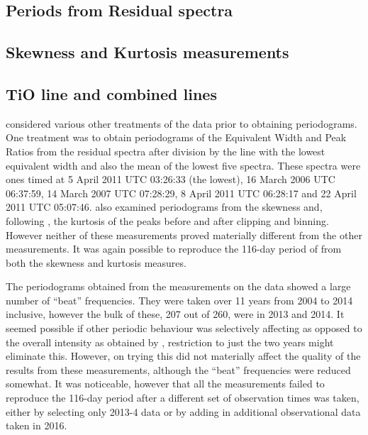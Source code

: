 \subsection{Periods from Residual spectra}
\protect\label{section:residualper}

\subsection{Skewness and Kurtosis measurements}
\protect\label{section:skewkurtper}

\subsection{TiO line and combined lines}
\protect\label{section:tioper}

{\FirstP} considered various other treatments of the data prior to obtaining periodograms. One treatment was to obtain
periodograms of the Equivalent Width and Peak Ratios from the residual spectra after division by the line with the
lowest equivalent width and also the mean of the lowest five spectra. These spectra were ones timed at 5 April 2011 UTC
03:26:33 (the lowest), 16 March 2006 UTC 06:37:59, 14 March 2007 UTC 07:28:29, 8 April 2011 UTC 06:28:17 and 22 April
2011 UTC 05:07:46. {\FirstP} also examined periodograms from the skewness and, following \citet{flores16},
the kurtosis of the {\ha} peaks before and after clipping and binning. However neither of these measurements proved
materially different from the other measurements. It was again possible to reproduce the 116-day period of
\citet{suarezmascareno15} from both the skewness and kurtosis measures.

The periodograms obtained from the {\ha} measurements on the {\harps} data showed a large number of ``beat''
frequencies. They were taken over 11 years from 2004 to 2014 inclusive, however the bulk of these, 207 out of 260, were
in 2013 and 2014. It seemed possible if other periodic behaviour was selectively affecting {\ha} as opposed to the
overall intensity as obtained by \asas, restriction to just the two years might eliminate this. However, on trying this
did not materially affect the quality of the results from these measurements, although the ``beat'' frequencies were
reduced somewhat. It was noticeable, however that all the measurements failed to reproduce the 116-day period after a
different set of observation times was taken, either by selecting only 2013-4 data or by adding in additional
observational data taken in 2016.

